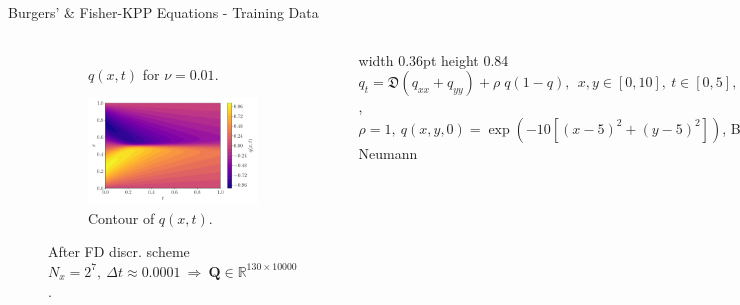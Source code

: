 \begin{frame}{Burgers' \& Fisher-KPP Equations - Training Data}
\begin{columns}[T,onlytextwidth]
\begin{figure}
\begin{subfigure}[t]{0.47\textwidth}
        \caption{\(q(x,t)\) for \(\nu=0.01\).}
        \label{fig:burgers-slices}
      \end{subfigure}
      \hspace{0.02\textwidth}
      \begin{subfigure}[t]{0.47\textwidth}
        \centering
        \includegraphics[width=\textwidth]{images/heatmap_001.pdf}
        \caption{Contour of \(q(x,t)\).}
        \label{fig:burgers-contour}
      \end{subfigure}
      \caption*{After FD discr. scheme $N_x=2^7,~\Delta t\approx0.0001 ~\!\!\Rightarrow\!\!~ \mathbf{Q}\in\mathbb{R}^{130\times 10000}$.}
      \label{fig:burgers-data}
    \end{figure}
    \centering
    \vrule width 0.36pt height 0.84\textheight
    {\tiny $q_t = \mathfrak{D}(q_{xx} +  q_{yy}) +\rho\;q(1-q),~~x,y\in[0,10],~t\in[0,5], ~\mathfrak{D}=0.1$,\\
    $\rho=1, ~q(x,y,0)=\exp(-10[(x-5)^2 + (y-5)^2])$, BCs: Neumann}
    \begin{figure}
      \centering
      \begin{subfigure}[t]{\textwidth}
        \centering
        \includegraphics[width=\textwidth]{images/3Dfkpp.pdf}
        \caption{\(q(x,y,t)\) for \(\mathfrak{D}=0.1,\rho=1\).}

\end{subfigure}
\end{figure}
\end{columns}
\end{frame}
